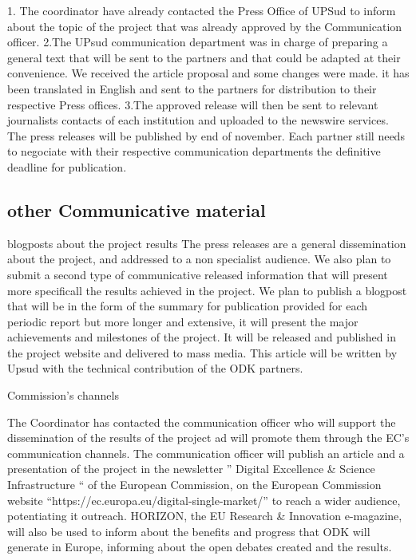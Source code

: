 \documentclass{deliverablereport}
\begin{document}
 1. The coordinator have already contacted the Press Office of UPSud to inform about the topic
 of the project that was already approved by the Communication officer. 
 2.The UPsud communication department was in charge of preparing a general text that will be sent
 to the partners and that could be adapted at their convenience. We received the article proposal 
 and some changes were made. it has been translated in English and sent to the partners 
 for distribution to their respective Press offices. 
 3.The approved release will then be sent to relevant journalists contacts of each institution 
 and uploaded to the newswire services. The press releases will be published by end of november. 
 Each partner still needs to negociate with their respective communication departments the 
 definitive deadline for publication.



\subsection{other Communicative material}

 \item blogposts about the project results
 The press releases are a general dissemination about the project, and addressed to 
 a non specialist audience. We also plan to submit a second type of communicative released 
 information that will present more specificall the results achieved in the project.
 We plan to publish a blogpost that will be in the form of the summary for publication
 provided for each periodic report but more longer and  extensive, it will present the 
 major achievements and milestones of the project. It will be released and published in 
 the project website and delivered to mass media. This article will be written by Upsud 
 with the technical contribution of the ODK partners. 
 
 
 \European Commission's channels
 
The Coordinator has contacted the communication officer  who will support the dissemination
of the results of the project ad will promote them through the EC's communication channels. 
The communication officer will publish an article and a presentation of the project in the 
newsletter ” Digital Excellence & Science Infrastructure “ of the European Commission, 
on the European Commission website “https://ec.europa.eu/digital-single-market/” to reach 
a wider audience, potentiating it outreach. 
HORIZON, the EU Research & Innovation e-magazine, will also be used to inform about 
the benefits and progress that ODK will generate in Europe, informing about 
the open debates created and the results.
\end{document}
